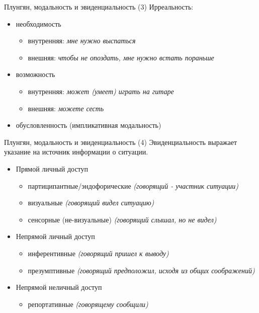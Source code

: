 \documentclass{beamer}
\begin{document}
\begin{frame}{Плунгян, модальность и эвиденциальность (3)}
Ирреальность:\\
\bigskip
\begin{itemize}
  \item необходимость 
    \begin{itemize}
      \item внутренняя: \textit{мне нужно выспаться}
      \item внешняя: \textit{чтобы не опоздать, мне нужно встать пораньше}
    \end{itemize}
  \item возможность 
    \begin{itemize}
      \item внутренняя: \textit{может (умеет) играть на гитаре}
      \item внешняя: \textit{можете сесть}
    \end{itemize}
  \item обусловленность (импликативная модальность)
\end{itemize}
\end{frame}

\begin{frame}{Плунгян, модальность и эвиденциальность (4)}
Эвиденциальность выражает указание на источник информации о ситуации.\\
\bigskip
\begin{itemize}
  \item Прямой личный доступ
    \begin{itemize}
      \item партиципантные/эндофорические \textit{(говорящий - участник ситуации)}
      \item визуальные \textit{(говорящий видел ситуацию)}
      \item сенсорные (не-визуальные) \textit{(говорящий слышал, но не видел)}
    \end{itemize}
  \item Непрямой личный доступ
    \begin{itemize}
      \item инферентивные \textit{(говорящий пришел к выводу)}
      \item презумптивные \textit{(говорящий предположил, исходя из общих соображений)}
    \end{itemize}
  \item Непрямой неличный доступ
    \begin{itemize}
      \item репортативные \textit{(говорящему сообщили)}
    \end{itemize}
\end{itemize}
\end{frame}
\end{document}
